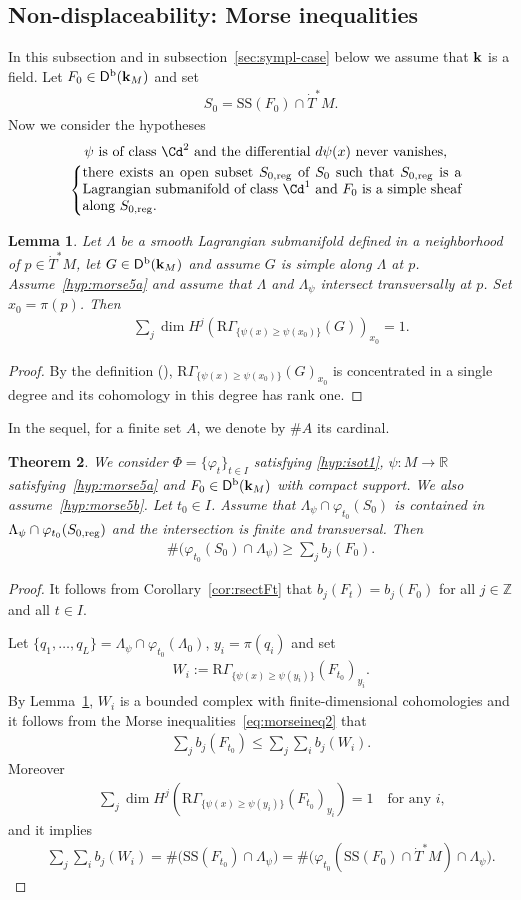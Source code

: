 \documentclass[12pt,leqno]{article}
\newtheorem{theorem}{Theorem}[section]
\newtheorem{lemma}[theorem]{Lemma}
\theoremstyle{definition}
\newcommand{\reg}{{\rm reg}}
\newcommand{\R}{{\mathbb{R}}}
\newcommand{\Z}{{\mathbb{Z}}}
\def\phi{{\varphi}}
\newcommand{\cor}{{\bf k}}
\renewcommand{\to}[1][]{\xrightarrow[]{#1}}
\newcommand{\rsect}{\mathrm{R}\Gamma}
\newcommand{\eqdot}{\mathbin{:=}}
\newcommand{\cl}{\colon}
\newcommand{\bl}{\bigl(}
\newcommand{\br}{\bigr)}
\newcommand{\eq}{\begin{eqnarray}}
\newcommand{\eneq}{\end{eqnarray}}
\newcommand{\eqn}{\begin{eqnarray*}}
\newcommand{\eneqn}{\end{eqnarray*}}
\newcommand{\Der}[1][]{\mathsf{D}^{#1}}
\newcommand{\Derb}{\Der[\mathrm{b}]}
\newcommand{\SSi}{\mathrm{SS}}
\newcommand{\dT}{{\dot{T}}}
\newcommand{\dTM}{{\dT}^*M}
\numberwithin{equation}{section}
\begin{document}
\subsection{Non-displaceability: Morse inequalities}
In this subsection and in subsection~\ref{sec:sympl-case} below we assume that
$\cor$ is a field.
Let $F_0\in\Derb(\cor_M)$ and set
\eqn
&&S_0=\SSi(F_0)\cap\dTM.
\eneqn
Now we consider the hypotheses
\eq\label{hyp:morse5a}
&&\parbox{63ex}{$\psi$ is of class $\Cd^2$ and 
the differential $d\psi(x)$ never vanishes,}\\
\label{hyp:morse5b}
&&\left\{
\parbox{63ex}{there exists an open %
subset $S_{0,\reg}$ of $S_0$
such that $S_{0,\reg}$ is a Lagrangian submanifold of class $\Cd^1$
and $F_0$ is a simple sheaf along $S_{0,\reg}$.
}\right.
\eneq
\begin{lemma}\label{le:puretransv}
Let $\Lambda$ be a smooth Lagrangian submanifold defined in a
neighborhood of $p\in\dTM$, let $G\in\Derb(\cor_M)$ and assume $G$ is
simple along $\Lambda$ at $p$. Assume~\eqref{hyp:morse5a} 
and assume that $\Lambda$ and $\Lambda_\psi$
intersect transversally at $p$. Set $x_0=\pi(p)$. Then 
\eqn
&&\sum_j\dim H^j(\rsect_{\{\psi(x)\geq\psi(x_0)\}}(G))_{x_0}=1.
\eneqn
\end{lemma}
\begin{proof}
By the definition
(\cite[Definition~7.5.4]{KS90}),
$\rsect_{\{\psi(x)\geq\psi(x_0)\}}(G)_{x_0}$ is
concentrated in a single degree and its cohomology in this degree has
rank one.
\end{proof}
 In the sequel, for a finite set $A$, we denote by $\# A$ its cardinal.
\begin{theorem}\label{th:morse1}
We consider $\Phi=\{\phi_t\}_{t\in I}$ satisfying \eqref{hyp:isot1}, $\psi\cl M\to\R$ 
satisfying~\eqref{hyp:morse5a} and
$F_0\in\Derb(\cor_M)$ with compact support. We also assume~\eqref{hyp:morse5b}.
Let  $t_0\in I$. Assume that 
$\Lambda_\psi\cap\phi_{t_0}(S_0)$ is contained in 
$\Lambda_\psi\cap\phi_{t_0}(S_{0,\reg})$ and the intersection is
finite and transversal. Then 
\eqn
&&\#\bl\phi_{t_0}(S_0) \cap \Lambda_\psi\br\ge\sum_jb_j(F_0).
\eneqn
\end{theorem}
\begin{proof}
It follows from Corollary~\ref{cor:rsectFt} that $b_j(F_t)=b_j(F_0)$ for
all $j\in\Z$ and all $t\in I$. 

Let $\{q_1,\dots,q_L\}=\Lambda_\psi\cap\phi_{t_0}(\Lambda_0)$,
$y_i=\pi(q_i)$ and
set 
\eqn
&&W_i\eqdot\rsect_{\{\psi(x)\geq\psi(y_i)\}}(F_{t_0})_{y_i}.
\eneqn
By Lemma~\ref{le:puretransv}, $W_i$ is a bounded
complex with finite-dimensional cohomologies 
 and it follows from
the Morse inequalities~\eqref{eq:morseineq2} that
\eqn
&&\sum_jb_j(F_{t_0})\leq \sum_j\sum_ib_j(W_i).
\eneqn
Moreover
\eqn
&&\sum_j\dim H^j(\rsect_{\{\psi(x)\geq\psi(y_i)\}}(F_{t_0})_{y_i})=1
\quad\text{for any $i$,}
\eneqn
and it implies
\eqn
&&\sum_j\sum_i b_j(W_i)=\#\bl\SSi(F_{t_0})\cap \Lambda_\psi\br
=\#\bl\phi_{t_0}(\SSi(F_0)\cap\dTM) \cap \Lambda_\psi\br.
\eneqn
\end{proof}
\end{document}
